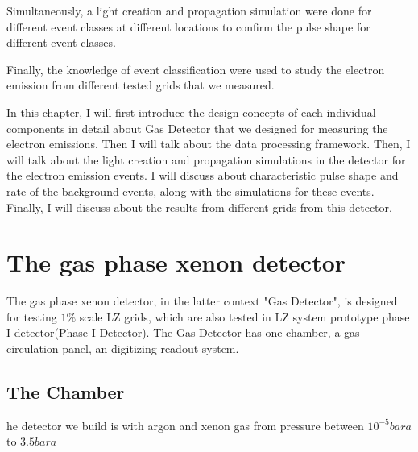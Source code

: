Simultaneously, a light creation and propagation simulation were done for different event classes at different locations to confirm the pulse shape for different event classes.  

Finally, the knowledge of event classification were used to study the electron emission from different tested grids that we measured.  

In this chapter, I will first introduce the design concepts of each individual components in detail about Gas Detector that we designed for measuring the electron emissions. Then I will talk about the data processing framework. Then, I will talk about the light creation and propagation simulations in the detector for the electron emission events. I will discuss about characteristic pulse shape and rate of the background events, along with the simulations for these events. Finally, I will discuss about the results from different grids from this detector.  

\section{The gas phase xenon detector}
The gas phase xenon detector, in the latter context "Gas Detector", is designed for testing $1\%$ scale LZ grids, which are also tested in LZ system prototype phase I detector(Phase I Detector). The Gas Detector has one chamber, a gas circulation panel, an digitizing readout system.   
\subsection{The Chamber}
he detector we build is with argon and xenon gas from pressure between \(10^{-5} bara \) to \(3.5 bara\)

